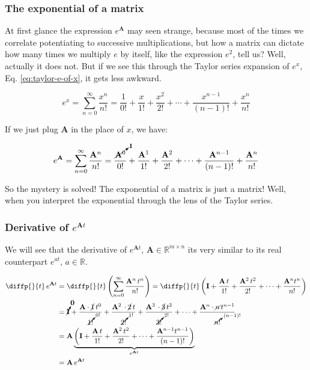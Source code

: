 \documentclass[12pt]{article}
\begin{document}
\subsubsection{The exponential of a matrix}
At first glance the expression $e^{\mathbf{A}}$ may seen strange, because most of the times we correlate potentiating to successive multiplications, but how a matrix can dictate how many times we multiply $e$ by itself, like the expression $e^2$, tell us? Well, actually it does not. But if we see this through the Taylor series expansion of $e^x$, Eq. \ref{eq:taylor-e-of-x}, it gets less awkward.

\begin{equation}
    e^x = \sum_{n = 0}^{\infty}{\frac{x^n}{n!}} = \frac{1}{0!} + \frac{x}{1!} + \frac{x^2}{2!} + \cdots + \frac{x^{n-1}}{(n-1)!} + \frac{x^n}{n!}
\label{eq:taylor-e-of-x}
\end{equation}

If we just plug $\mathbf{A}$ in the place of $x$, we have:

\begin{equation}
    e^\mathbf{A} = \sum_{n=0}^{\infty} {\frac{\mathbf{A}^n}{n!}} = \frac{\cancelto{\mathbf{I}}{\mathbf{A}^0}}{0!} + \frac{\mathbf{A}^1}{1!} + \frac{\mathbf{A}^2}{2!} + \cdots + \frac{\mathbf{A}^{n-1}}{(n-1)!} + \frac{\mathbf{A}^n}{n!}
\label{eq:taylor-e-of-A}
\end{equation}

So the mystery is solved! The exponential of a matrix is just a matrix! Well, when you interpret the exponential through the lens of the Taylor series.

\subsubsection{Derivative of $e^{\mathbf{A}t}$}
We will see that the derivative of $e^{\mathbf{A}t}$, $\mathbf{A} \in \mathbb{R}^{m \times n}$ its very similar to its real counterpart $e^{at}$, $a \in \mathbb{R}$.

\begin{equation}\begin{aligned}
    \diffp{}{t} \, e^{\mathbf{A}t} &= \diffp{}{t} \left( \sum_{n=0}^{\infty} {\frac{\mathbf{A}^n \, t^n}{n!}} \right) = \diffp{}{t} \left( \mathbf{I} + \frac{\mathbf{A} \, t}{1!} + \frac{\mathbf{A}^2 \, t^2}{2!} + \cdots + \frac{\mathbf{A}^n t^n}{n!} \right)\\
    &= \cancelto{\mathbf{0}}{\mathbf{I}} + \frac{\mathbf{A} \cdot \cancel{1} \,t^0}{\cancelto{0!}{1!}} + \frac{\mathbf{A}^2 \, \cdot \cancel{2} \, t}{\cancelto{1!}{2!}} + \frac{\mathbf{A}^3 \, \cdot \cancel{3} \, t^2}{\cancelto{2!}{3!}} + \cdots + \frac{\mathbf{A}^n \cdot \cancel{n} \, t^{n-1}}{\cancelto{(n-1)!}{n!}} \\
    &= \mathbf{A} \underbrace{\left( \mathbf{I} + \frac{\mathbf{A} \, t}{1!} + \frac{\mathbf{A}^2 \, t^2}{2!} + \cdots + \frac{\mathbf{A}^{n-1} t^{n-1}}{(n-1)!} \right)}_{e^{\mathbf{A}t}}\\
    &= \mathbf{A} \,e^{\mathbf{A}t}
\end{aligned}
\label{eq:derivative-matrix-exponential}
\end{equation}
\end{document}
